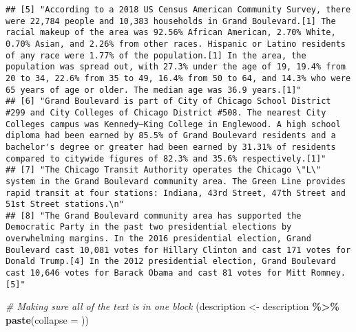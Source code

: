 \documentclass[
]{article}
\newenvironment{Shaded}{\begin{snugshade}}{\end{snugshade}}
\newcommand{\AttributeTok}[1]{\textcolor[rgb]{0.13,0.29,0.53}{#1}}
\newcommand{\CommentTok}[1]{\textcolor[rgb]{0.56,0.35,0.01}{\textit{#1}}}
\newcommand{\FunctionTok}[1]{\textcolor[rgb]{0.13,0.29,0.53}{\textbf{#1}}}
\newcommand{\NormalTok}[1]{#1}
\newcommand{\OtherTok}[1]{\textcolor[rgb]{0.56,0.35,0.01}{#1}}
\newcommand{\SpecialCharTok}[1]{\textcolor[rgb]{0.81,0.36,0.00}{\textbf{#1}}}
\newcommand{\StringTok}[1]{\textcolor[rgb]{0.31,0.60,0.02}{#1}}
\begin{document}
\begin{verbatim}
## [5] "According to a 2018 US Census American Community Survey, there were 22,784 people and 10,383 households in Grand Boulevard.[1] The racial makeup of the area was 92.56% African American, 2.70% White, 0.70% Asian, and 2.26% from other races. Hispanic or Latino residents of any race were 1.77% of the population.[1] In the area, the population was spread out, with 27.3% under the age of 19, 19.4% from 20 to 34, 22.6% from 35 to 49, 16.4% from 50 to 64, and 14.3% who were 65 years of age or older. The median age was 36.9 years.[1]"
## [6] "Grand Boulevard is part of City of Chicago School District #299 and City Colleges of Chicago District #508. The nearest City Colleges campus was Kennedy–King College in Englewood. A high school diploma had been earned by 85.5% of Grand Boulevard residents and a bachelor's degree or greater had been earned by 31.31% of residents compared to citywide figures of 82.3% and 35.6% respectively.[1]"                                                                                                                                         
## [7] "The Chicago Transit Authority operates the Chicago \"L\" system in the Grand Boulevard community area. The Green Line provides rapid transit at four stations: Indiana, 43rd Street, 47th Street and 51st Street stations.\n"                                                                                                                                                                                                                                                                                                                       
## [8] "The Grand Boulevard community area has supported the Democratic Party in the past two presidential elections by overwhelming margins. In the 2016 presidential election, Grand Boulevard cast 10,081 votes for Hillary Clinton and cast 171 votes for Donald Trump.[4] In the 2012 presidential election, Grand Boulevard cast 10,646 votes for Barack Obama and cast 81 votes for Mitt Romney.[5]"
\end{verbatim}

\begin{Shaded}
\begin{Highlighting}[]
\CommentTok{\# Making sure all of the text is in one block}
\NormalTok{(description }\OtherTok{\textless{}{-}}\NormalTok{ description }\SpecialCharTok{\%\textgreater{}\%} \FunctionTok{paste}\NormalTok{(}\AttributeTok{collapse =} \StringTok{\textquotesingle{} \textquotesingle{}}\NormalTok{))}
\end{Highlighting}
\end{Shaded}
\end{document}
